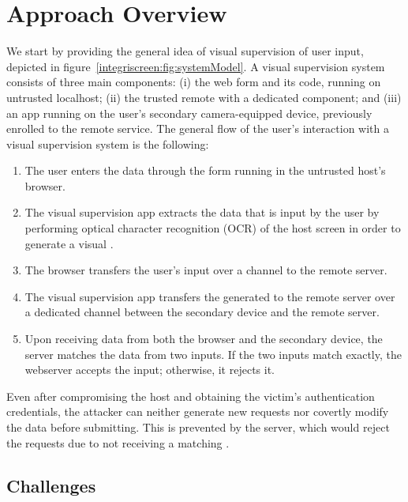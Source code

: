 \section{Approach Overview}
\label{integriscreen:sec:systemDesign}


We start by providing the general idea of visual supervision of user input, depicted in figure~\ref{integriscreen:fig:systemModel}.
A visual supervision system consists of three main components: (i) the web form and its code, running on untrusted localhost; (ii) the trusted remote \server with a dedicated component; and (iii) an app running on the user's secondary camera-equipped device, previously enrolled to the remote service. The general flow of the user's interaction with a visual supervision system is the following:

\begin{enumerate}
  \item[\one] The user enters the data through the form running in the untrusted host's browser.

  \item[\two] The visual supervision app extracts the data that is input by the user by performing optical character recognition (OCR) of the host screen in order to generate a visual \textit{\POI}.

  \item[\three] The browser transfers the user's input over a \https channel to the remote server.

  \item[\four] The visual supervision app transfers the generated \POI to the remote server over a dedicated \tls channel between the secondary device and the remote server.

  \item[\five] Upon receiving data from both the browser and the secondary device, the server matches the data from two inputs.
  If the two inputs match exactly, the webserver accepts the input; otherwise, it rejects it.
\end{enumerate}


Even after compromising the host and obtaining the victim's authentication credentials, the attacker can neither generate new requests nor covertly modify the data before submitting. This is prevented by the server, which would reject the requests due to not receiving a matching \POI.


\subsection{Challenges}
\label{sec:systemDesign:challenger}

